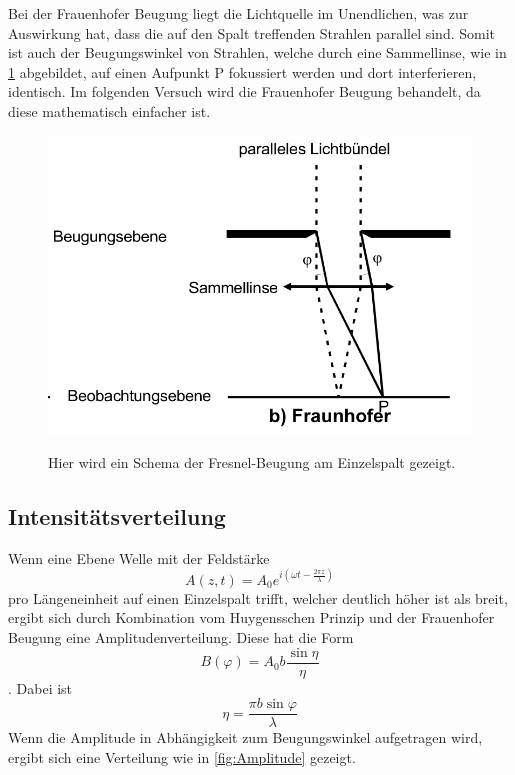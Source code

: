 Bei der Frauenhofer Beugung liegt die Lichtquelle im Unendlichen, was zur Auswirkung hat, dass die auf den Spalt treffenden Strahlen parallel sind.
Somit ist auch der Beugungswinkel von Strahlen, welche durch eine Sammellinse, wie in \ref{fig:Frauenhofer} abgebildet, auf einen Aufpunkt P fokussiert werden und dort interferieren, identisch.
Im folgenden Versuch wird die Frauenhofer Beugung behandelt, da diese mathematisch einfacher ist.

\begin{figure}[H]
    \centering
    \caption{Hier wird ein Schema der Fresnel-Beugung am Einzelspalt gezeigt.}
    \includegraphics{Bilder/Frauenhofer.png}
    \label{fig:Frauenhofer}
\end{figure}

\subsection{Intensitätsverteilung}
Wenn eine Ebene Welle mit der Feldstärke
\begin{equation}
    A(z,t)=A_0 e^{i(\omega t - \frac{2 \pi z}{\lambda} )}
    \label{eqn:Feldstärke}
\end{equation}
pro Längeneinheit auf einen Einzelspalt trifft, welcher deutlich höher ist als breit, ergibt sich durch Kombination vom Huygensschen Prinzip und der Frauenhofer Beugung eine Amplitudenverteilung.
Diese hat die Form 
\begin{equation}
    B(\varphi)=A_0 b \frac{\sin \eta}{\eta}
    \label{eqn:Amplitude}
\end{equation}
 .
 Dabei ist 
 \begin{equation}
    \eta = \frac{\pi b \sin{\varphi}}{\lambda}
 \end{equation}
Wenn die Amplitude in Abhängigkeit zum Beugungswinkel aufgetragen wird, ergibt sich eine Verteilung wie in \ref{fig:Amplitude} gezeigt.


